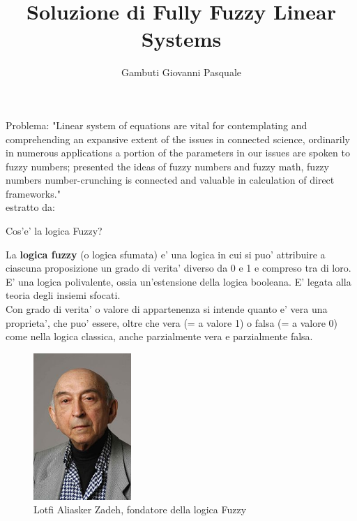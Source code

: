 \documentclass[9pt,aspectratio=169]{beamer}
\date[]{}
\title[]{Soluzione di Fully Fuzzy Linear Systems}
\author[]{Gambuti Giovanni Pasquale}
\begin{document}
\maketitle
\begin{frame}{Problema:}
    "Linear system of equations are vital for contemplating and comprehending an expansive extent of the issues in connected science, ordinarily in numerous applications a portion of the parameters in our issues are spoken to fuzzy numbers; presented the ideas of fuzzy numbers and fuzzy math, fuzzy numbers number-crunching is connected and valuable in calculation of direct frameworks." \\
    
    \hfill\break
    estratto da: \cite{eliminazione}

\end{frame}
\begin{frame}{Cos'e' la logica Fuzzy?}
\begin{multicols}{2}
La \textbf{logica fuzzy} (o logica sfumata) e' una logica in cui si puo' attribuire a ciascuna proposizione un grado di verita' diverso da 0 e 1 e compreso tra di loro. E' una logica polivalente, ossia un'estensione della logica booleana. E' legata alla teoria degli insiemi sfocati. \\Con grado di verita' o valore di appartenenza si intende quanto e' vera una proprieta', che puo' essere, oltre che vera (= a valore 1) o falsa (= a valore 0) come nella logica classica, anche parzialmente vera e parzialmente falsa.

\begin{figure}[h]
\includegraphics[width=0.33\textwidth]{images/Lotfi_Zadeh_Berkeley_c.jpg}
\caption{Lotfi Aliasker Zadeh, fondatore della logica Fuzzy}
\end{figure}
    
\end{multicols}

\end{frame}
\end{document}
